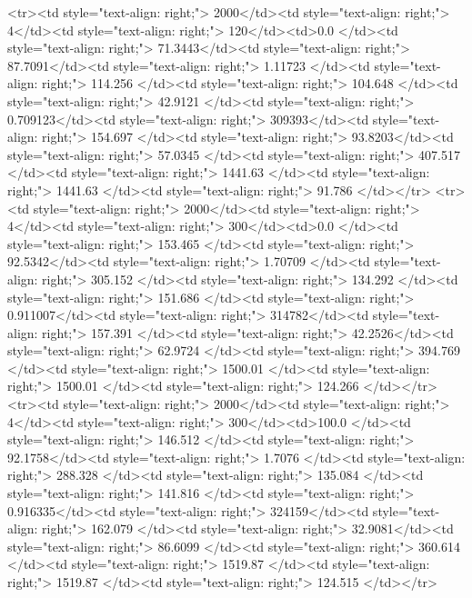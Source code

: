 <tr><td style="text-align: right;">      2000</td><td style="text-align: right;">         4</td><td style="text-align: right;">           120</td><td>0.0          </td><td style="text-align: right;">                71.3443</td><td style="text-align: right;">            87.7091</td><td style="text-align: right;">         1.11723 </td><td style="text-align: right;">        114.256 </td><td style="text-align: right;">           104.648 </td><td style="text-align: right;">              42.9121  </td><td style="text-align: right;">             0.709123</td><td style="text-align: right;">              309393</td><td style="text-align: right;">                      154.697 </td><td style="text-align: right;">            93.8203</td><td style="text-align: right;">                57.0345 </td><td style="text-align: right;">       407.517 </td><td style="text-align: right;">   1441.63 </td><td style="text-align: right;">      1441.63 </td><td style="text-align: right;">                 91.786 </td></tr>
<tr><td style="text-align: right;">      2000</td><td style="text-align: right;">         4</td><td style="text-align: right;">           300</td><td>0.0          </td><td style="text-align: right;">               153.465 </td><td style="text-align: right;">            92.5342</td><td style="text-align: right;">         1.70709 </td><td style="text-align: right;">        305.152 </td><td style="text-align: right;">           134.292 </td><td style="text-align: right;">             151.686   </td><td style="text-align: right;">             0.911007</td><td style="text-align: right;">              314782</td><td style="text-align: right;">                      157.391 </td><td style="text-align: right;">            42.2526</td><td style="text-align: right;">                62.9724 </td><td style="text-align: right;">       394.769 </td><td style="text-align: right;">   1500.01 </td><td style="text-align: right;">      1500.01 </td><td style="text-align: right;">                124.266 </td></tr>
<tr><td style="text-align: right;">      2000</td><td style="text-align: right;">         4</td><td style="text-align: right;">           300</td><td>100.0        </td><td style="text-align: right;">               146.512 </td><td style="text-align: right;">            92.1758</td><td style="text-align: right;">         1.7076  </td><td style="text-align: right;">        288.328 </td><td style="text-align: right;">           135.084 </td><td style="text-align: right;">             141.816   </td><td style="text-align: right;">             0.916335</td><td style="text-align: right;">              324159</td><td style="text-align: right;">                      162.079 </td><td style="text-align: right;">            32.9081</td><td style="text-align: right;">                86.6099 </td><td style="text-align: right;">       360.614 </td><td style="text-align: right;">   1519.87 </td><td style="text-align: right;">      1519.87 </td><td style="text-align: right;">                124.515 </td></tr>
